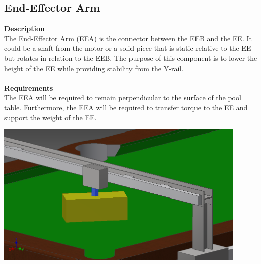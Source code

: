 \documentclass[titlepage]{article}
\begin{document}
\subsection{End-Effector Arm}
\textbf{Description}\\
The End-Effector Arm (EEA) is the connector between the EEB and the EE. It could be a shaft from the motor or a solid piece that is static relative to the EE but rotates in relation to the EEB. The purpose of this component is to lower the height of the EE while providing stability from the Y-rail.\\\\
\textbf{Requirements}\\
The EEA will be required to remain perpendicular to the surface of the pool table. Furthermore, the EEA will be required to transfer torque to the EE and support the weight of the EE.
\begin{center}
	\includegraphics[width = 0.9\textwidth]{efArm.png}
\label{fig:eeaFig}
\end{center}

\newpage
\end{document}
